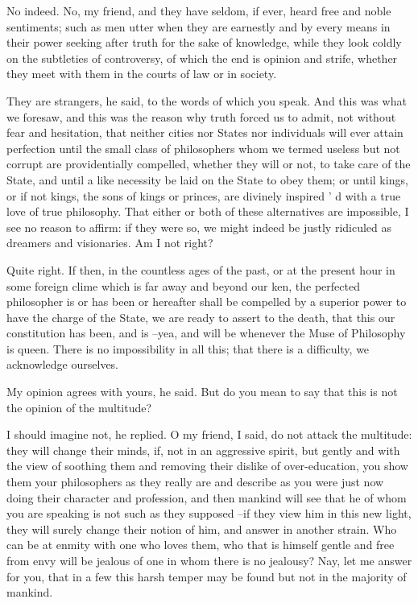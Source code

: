 No indeed.
No, my friend, and they have seldom, if ever, heard free and noble sentiments; such as men utter when they are earnestly and by every means in their power seeking after truth for the sake of knowledge, while they look coldly on the subtleties of controversy, of which the end is opinion and strife, whether they meet with them in the courts of law or in society.

They are strangers, he said, to the words of which you speak.
And this was what we foresaw, and this was the reason why truth forced us to admit, not without fear and hesitation, that neither cities nor States nor individuals will ever attain perfection until the small class of philosophers whom we termed useless but not corrupt are providentially compelled, whether they will or not, to take care of the State, and until a like necessity be laid on the State to obey them; or until kings, or if not kings, the sons of kings or princes, are divinely inspired ' d with a true love of true philosophy. That either or both of these alternatives are impossible, I see no reason to affirm: if they were so, we might indeed be justly ridiculed as dreamers and visionaries. Am I not right?

Quite right.
If then, in the countless ages of the past, or at the present hour in some foreign clime which is far away and beyond our ken, the perfected philosopher is or has been or hereafter shall be compelled by a superior power to have the charge of the State, we are ready to assert to the death, that this our constitution has been, and is --yea, and will be whenever the Muse of Philosophy is queen. There is no impossibility in all this; that there is a difficulty, we acknowledge ourselves.

My opinion agrees with yours, he said.
But do you mean to say that this is not the opinion of the multitude?

I should imagine not, he replied.
O my friend, I said, do not attack the multitude: they will change their minds, if, not in an aggressive spirit, but gently and with the view of soothing them and removing their dislike of over-education, you show them your philosophers as they really are and describe as you were just now doing their character and profession, and then mankind will see that he of whom you are speaking is not such as they supposed --if they view him in this new light, they will surely change their notion of him, and answer in another strain. Who can be at enmity with one who loves them, who that is himself gentle and free from envy will be jealous of one in whom there is no jealousy? Nay, let me answer for you, that in a few this harsh temper may be found but not in the majority of mankind.

